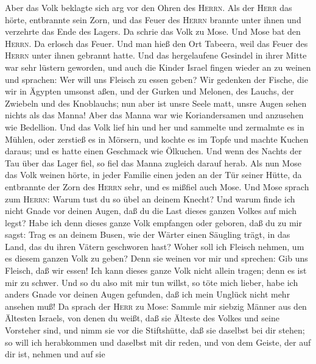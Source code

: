  Aber das Volk beklagte sich arg vor den Ohren des
\textsc{Herrn}. Als der \textsc{Herr} das hörte, entbrannte sein Zorn,
und das Feuer des \textsc{Herrn} brannte unter ihnen und verzehrte das
Ende des Lagers.  Da schrie das Volk zu Mose. Und Mose bat
den \textsc{Herrn}. Da erlosch das Feuer.  Und man hieß
den Ort Tabeera, weil das Feuer des \textsc{Herrn} unter ihnen gebrannt
hatte.  Und das hergelaufene Gesindel in ihrer Mitte war
sehr lüstern geworden, und auch die Kinder Israel fingen wieder an zu
weinen und sprachen: Wer will uns Fleisch zu essen geben? 
Wir gedenken der Fische, die wir in Ägypten umsonst aßen, und der Gurken
und Melonen, des Lauchs, der Zwiebeln und des Knoblauchs; 
nun aber ist unsre Seele matt, unsre Augen sehen nichts als das Manna!
 Aber das Manna war wie Koriandersamen und anzusehen wie
Bedellion.  Und das Volk lief hin und her und sammelte und
zermalmte es in Mühlen, oder zerstieß es in Mörsern, und kochte es im
Topfe und machte Kuchen daraus; und es hatte einen Geschmack wie
Ölkuchen.  Und wenn des Nachts der Tau über das Lager
fiel, so fiel das Manna zugleich darauf herab.  Als nun
Mose das Volk weinen hörte, in jeder Familie einen jeden an der Tür
seiner Hütte, da entbrannte der Zorn des \textsc{Herrn} sehr, und es
mißfiel auch Mose.  Und Mose sprach zum \textsc{Herrn}:
Warum tust du so übel an deinem Knecht? Und warum finde ich nicht Gnade
vor deinen Augen, daß du die Last dieses ganzen Volkes auf mich legst?
 Habe ich denn dieses ganze Volk empfangen oder geboren,
daß du zu mir sagst: Trag es an deinem Busen, wie der Wärter einen
Säugling trägt, in das Land, das du ihren Vätern geschworen hast?
 Woher soll ich Fleisch nehmen, um es diesem ganzen Volk
zu geben? Denn sie weinen vor mir und sprechen: Gib uns Fleisch, daß wir
essen!  Ich kann dieses ganze Volk nicht allein tragen;
denn es ist mir zu schwer.  Und so du also mit mir tun
willst, so töte mich lieber, habe ich anders Gnade vor deinen Augen
gefunden, daß ich mein Unglück nicht mehr ansehen muß! 
Da sprach der \textsc{Herr} zu Mose: Sammle mir siebzig Männer aus den
Ältesten Israels, von denen du weißt, daß sie Älteste des Volkes und
seine Vorsteher sind, und nimm sie vor die Stiftshütte, daß sie daselbst
bei dir stehen;  so will ich herabkommen und daselbst mit
dir reden, und von dem Geiste, der auf dir ist, nehmen und auf sie
